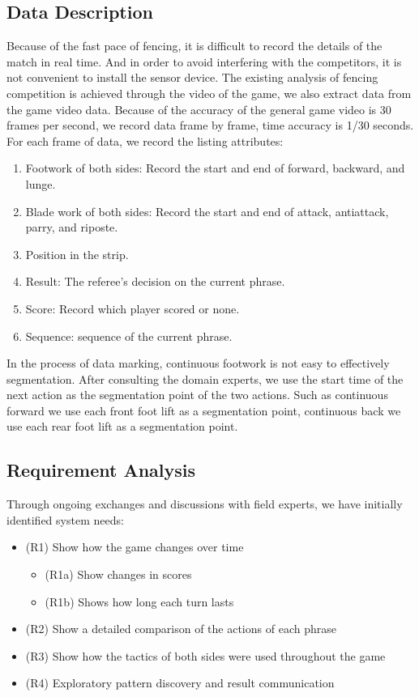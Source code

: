\documentclass[journal]{vgtc}                %
\begin{document}
\subsection{Data Description}
Because of the fast pace of fencing, it is difficult to record the details of the match in real time.
And in order to avoid interfering with the competitors, it is not convenient to install the sensor device.
The existing analysis of fencing competition is achieved through the video of the game, we also extract data from the game video data.
Because of the accuracy of the general game video is 30 frames per second, we record data frame by frame, time accuracy is 1/30 seconds. For each frame of data, we record the listing attributes:
\begin{enumerate}
	\item Footwork of both sides: Record the start and end of forward, backward, and lunge.
	\item Blade work of both sides: Record the start and end of attack, antiattack, parry, and riposte.
	\item Position in the strip.
	\item Result: The referee's decision on the current phrase.
	\item Score: Record which player scored or none.
	\item Sequence: sequence of the current phrase.	
\end{enumerate} 
In the process of data marking, continuous footwork is not easy to effectively segmentation.
After consulting the domain experts, we use the start time of the next action as the segmentation point of the two actions.
Such as continuous forward we use each front foot lift as a segmentation point, continuous back we use each rear foot lift as a segmentation point.

\subsection{Requirement Analysis}
Through ongoing exchanges and discussions with field experts, we have initially identified system needs:
\begin{itemize}
	\item (R1) Show how the game changes over time
	\begin{itemize}
		\item (R1a) Show changes in scores
		\item (R1b) Shows how long each turn lasts
	\end{itemize}
	\item (R2) Show a detailed comparison of the actions of each phrase
	\item (R3) Show how the tactics of both sides were used throughout the game
	\item (R4) Exploratory pattern discovery and result communication
\end{itemize}
\end{document}
